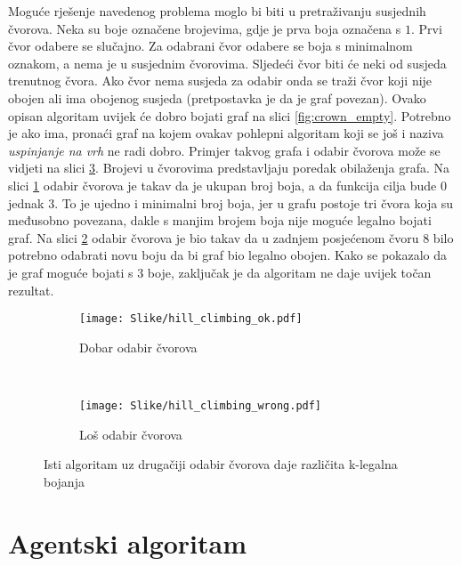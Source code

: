 \documentclass[times, utf8, diplomski, numeric]{fer}
\begin{document}
Moguće rješenje navedenog problema moglo bi biti u pretraživanju susjednih čvorova. Neka su boje označene brojevima, gdje je prva boja označena s $1$. Prvi čvor odabere se slučajno. Za odabrani čvor odabere se boja s minimalnom oznakom, a nema je u susjednim čvorovima. Sljedeći čvor biti će neki od susjeda trenutnog čvora. Ako čvor nema susjeda za odabir onda se traži čvor koji nije obojen ali ima obojenog susjeda (pretpostavka je da je graf povezan). Ovako opisan algoritam uvijek će dobro bojati graf na slici \ref{fig:crown_empty}. Potrebno je ako ima, pronaći graf na kojem ovakav pohlepni algoritam koji se još i naziva \emph{uspinjanje na vrh} ne radi dobro. Primjer takvog grafa i odabir čvorova može se vidjeti na slici \ref{fig:hill_climbing}. Brojevi u čvorovima predstavljaju poredak obilaženja grafa. Na slici \ref{fig:hill_climbing_ok} odabir čvorova je takav da je ukupan broj boja, a da funkcija cilja bude $0$ jednak $3$. To je ujedno i minimalni broj boja, jer u grafu postoje tri čvora koja su međusobno povezana, dakle s manjim brojem boja nije moguće legalno bojati graf. Na slici \ref{fig:hill_climbing_wrong} odabir čvorova je bio takav da u zadnjem posjećenom čvoru $8$ bilo potrebno odabrati novu boju da bi graf bio legalno obojen. Kako se pokazalo da je graf moguće bojati s $3$ boje, zaključak je da algoritam ne daje uvijek točan rezultat.

\begin{figure}
        \centering
        \begin{subfigure}[b]{0.4\textwidth}
                \texttt{[image: Slike/hill\_climbing\_ok.pdf]}
                \caption{Dobar odabir čvorova}
                \label{fig:hill_climbing_ok}
        \end{subfigure}
        ~
        \begin{subfigure}[b]{0.4\textwidth}
                \texttt{[image: Slike/hill\_climbing\_wrong.pdf]}
                \caption{Loš odabir čvorova}
                \label{fig:hill_climbing_wrong}
        \end{subfigure}
        \caption{Isti algoritam uz drugačiji odabir čvorova daje različita k-legalna bojanja}
        \label{fig:hill_climbing}
\end{figure}



\section{Agentski algoritam}
\end{document}
